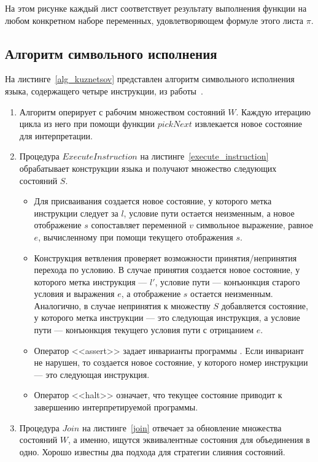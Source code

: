 На этом рисунке каждый лист соответствует результату выполнения функции на любом конкретном наборе переменных, удовлетворяющем формуле этого листа $\pi$.

\subsection{Алгоритм символьного исполнения}
На листинге~\ref{alg_kuznetsov} представлен алгоритм символьного исполнения языка, содержащего четыре инструкции, из работы~\cite{kuznetsov2012efficient}.
\begin{enumerate}
    \item Алгоритм оперирует с рабочим множеством состояний $W$. Каждую итерацию цикла  из него при помощи функции $pickNext$ извлекается новое состояние для интерпретации.
    \item Процедура $ExecuteInstruction$ на листинге~\ref{execute_instruction} обрабатывает конструкции языка и получают множество следующих состояний $S$.
        \begin{itemize}
            \item Для присваивания создается новое состояние, у которого метка инструкции следует за $l$, условие пути остается неизменным, а новое отображение $s$ 
            сопоставляет переменной $v$ символьное выражение, равное $e$, вычисленному при помощи текущего отображения $s$.
            \item Конструкция ветвления проверяет возможности принятия/непринятия перехода по условию. В случае принятия создается новое состояние, у которого метка инструкция --- $l'$, условие пути --- конъюнкция старого условия и выражения $e$, а отображение $s$ остается неизменным. Аналогично, в случае непринятия к множеству $S$ добавляется состояние, у которого метка инструкции --- это следующая инструкция, а условие пути --- конъюнкция текущего условия пути с отрицанием $e$.
            \item Оператор <<assert>> задает инварианты программы . Если инвариант не нарушен, то создается новое состояние, у которого номер инструкции --- это следующая инструкция.
            \item Оператор <<halt>> означает, что текущее состояние приводит к завершению интерпретируемой программы.
        \end{itemize}
    \item Процедура $Join$ на листинге~\ref{join} отвечает за обновление множества состояний $W$, а именно, ищутся эквивалентные состояния для объединения в одно. Хорошо известны два подхода для стратегии слияния состояний. 

\end{enumerate}
